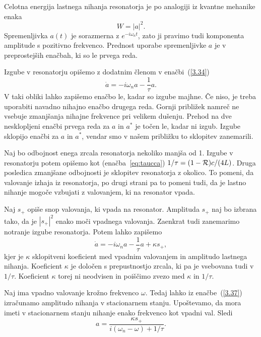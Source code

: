 Celotna energija lastnega nihanja resonatorja je po analogiji iz kvantne mehanike enaka
\begin{equation}
W=|a|^2.
\label{3.35}
\end{equation}
Spremenljivka $a(t)$ je sorazmerna z $e^{-i\omega_{n}t}$, 
zato ji pravimo tudi komponenta amplitude s pozitivno frekvenco. 
Prednost uporabe spremenljivke $a$ je v preprostejših enačbah, ki so le prvega reda. 

Izgube v resonatorju opišemo z dodatnim členom v enačbi~(\ref{3.34})
\begin{equation}
\dot{a}=-i\omega_{n}a-\frac{1}{\tau}a.
\label{3.36}
\end{equation}
V taki obliki lahko zapišemo enačbo le, kadar so izgube majhne. Če niso, 
je treba uporabiti navadno nihajno enačbo drugega reda. Gornji približek
namreč ne vsebuje zmanjšanja nihajne frekvence pri velikem dušenju.
Prehod na dve nesklopljeni enačbi prvega reda za $a$ in $a^*$
je točen le, kadar ni izgub. Izgube sklopijo enačbi za $a$ in $a^{\ast}$, 
vendar smo v našem približku to sklopitev zanemarili.

Naj bo odbojnost enega zrcala resonatorja nekoliko manjša od 1. Izgube v resonatorju 
potem opišemo kot (enačba~\ref{eq:taucca}) $1/\tau=(1-{\cal R})c/(4L)$. Druga posledica
zmanjšane odbojnosti je sklopitev resonatorja z okolico. To pomeni, 
da valovanje izhaja iz resonatorja, po drugi strani pa to pomeni tudi, da je 
lastno nihanje mogoče vzbujati z valovanjem, ki na resonator vpada.

Naj $s_{+}$ opiše snop valovanja, ki vpada na resonator. Amplituda $s_{+}$
naj bo izbrana tako, da je $|s_{+}|^{2}$ enako moči vpadnega valovanja. Zaenkrat
tudi zanemarimo notranje izgube resonatorja. Potem lahko
zapišemo 
\begin{equation}
\dot{a}=-i\omega_{n}a-\frac{1}{\tau}a+\kappa s_{+},
\label{3.37}
\end{equation}
kjer je $\kappa$ sklopitveni koeficient med vpadnim valovanjem in
amplitudo lastnega nihanja. Koeficient $\kappa$ je določen
s prepustnostjo zrcala, ki pa je vsebovana tudi v $1/\tau$. Koeficient
$\kappa$ torej ni neodvisen in poiščimo zvezo med $\kappa$ in $1/\tau$.

Naj ima vpadno valovanje krožno  frekvenco $\omega$. Tedaj lahko iz enačbe~(\ref{3.37}) 
izračunamo amplitudo nihanja v stacionarnem stanju. Upoštevamo, 
da mora imeti v stacionarnem stanju nihanje enako frekvenco
kot vpadni val. Sledi 
\begin{equation}
a=\frac{\kappa s_{+}}{i(\omega_{n}-\omega)+1/\tau}.
\label{3.38}
\end{equation}
 
